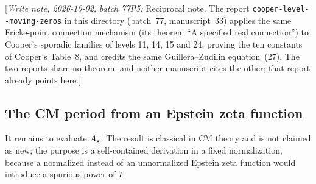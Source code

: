 \documentclass[11pt,letterpaper]{article}
\theoremstyle{remark}\newtheorem{remark}[theorem]{Remark}
\newcommand{\writenote}[1]{\textup{[}\emph{Write note, 2026-10-02, batch 77P5:} #1\textup{]}}
\newcounter{l7gtrsavedeq}
\begin{document}
\writenote{Reciprocal note. The report
\texttt{cooper-\allowbreak level-\allowbreak 15-\allowbreak moving-\allowbreak zeros}
in this directory (batch~77, manuscript~33) applies the same Fricke-point
connection mechanism (its theorem ``A specified real connection'') to
Cooper's sporadic families of levels 11, 14, 15 and 24, proving the ten
constants of Cooper's Table~8, and credits the same Guillera--Zudilin
equation~(27). The two reports share no theorem, and neither manuscript
cites the other; that report already points here.}

\subsection{The CM period from an Epstein zeta function}\label{l7g:tr:sec:epstein}
It remains to evaluate $A_\star$. The result is classical in CM theory and is
not claimed as new; the purpose is a self-contained derivation in a fixed
normalization, because a normalized instead of an unnormalized Epstein
zeta function would introduce a spurious power of $7$.
\end{document}
